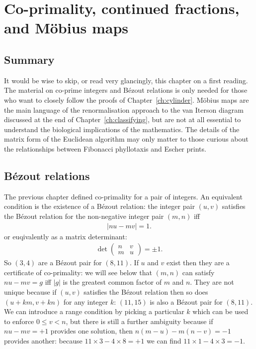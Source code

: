
		
\chapter{Co-primality, continued fractions, and M\"obius maps}
	\section*{Summary}
	{
	It would be wise to skip, or read very glancingly, this chapter on a first reading. 
	The material on co-prime integers and B\'ezout relations is  only needed for those who want to closely follow the proofs of Chapter~\ref{ch:cylinder}. M\"obius maps are the main language of  the renormalisation approach to the van Iterson diagram discussed at the end of Chapter~\ref{ch:classifying}, but are not at all essential to understand the biological implications of the mathematics.  The details of the matrix form of the Euclidean algorithm may only matter to those curious about the relationships between Fibonacci phyllotaxis and Escher prints.
}




\section{B\'ezout relations}
The previous chapter defined co-primality for a pair of integers. An equivalent condition is the existence of a  B\'ezout relation: the integer pair $(u,v)$ satisfies the B\'ezout relation for the non-negative integer pair $(m,n)$ iff
\begin{align}
	|n  u-mv| = 1.
\end{align}
or euqivalently as a matrix determinant:
\begin{align}
	\det \begin{pmatrix} n& v \\ m & u \end{pmatrix} = \pm 1.
\end{align}
So $(3,4)$ are a B\'ezout pair for $(8,11)$. 
If $u$ and $v$ exist then they are a certificate of co-primality: we will see below that $(m,n)$ can satisfy  $ n  u - m v= g$ iff $|g|$ is the greatest common factor of $m$ and $n$. They are not unique because if $(u,v)$ satisfies the B\'ezout relation then so does $(u+km,v+kn)$ for any integer $k$: $(11,15)$ is also a B\'ezout pair for $(8,11)$. We can introduce a range condition by picking a particular $k$ which can be used to enforce $0\leq v< n$, but there is still a further ambiguity because if
$n u- m v  =+1$ provides one solution, then $n(m-u)-m(n-v)=-1$ provides another: because $11\times3-4\times8 =+1$ we can find $11\times 1-4\times 3=-1$. 

